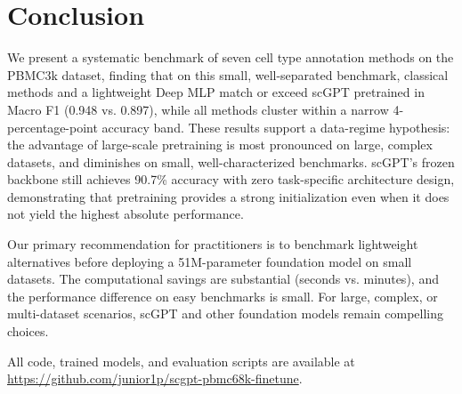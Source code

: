 \documentclass{article}
\begin{document}
\section{Conclusion}
\label{sec:conclusion}

We present a systematic benchmark of seven cell type annotation methods on the PBMC3k
dataset, finding that on this small, well-separated benchmark, classical methods and a
lightweight Deep MLP match or exceed scGPT pretrained in Macro F1 (0.948 vs. 0.897),
while all methods cluster within a narrow 4-percentage-point accuracy band. These results
support a data-regime hypothesis: the advantage of large-scale pretraining is most
pronounced on large, complex datasets, and diminishes on small, well-characterized
benchmarks. scGPT's frozen backbone still achieves 90.7\% accuracy with zero task-specific
architecture design, demonstrating that pretraining provides a strong initialization even
when it does not yield the highest absolute performance.

Our primary recommendation for practitioners is to benchmark lightweight alternatives
before deploying a 51M-parameter foundation model on small datasets. The computational
savings are substantial (seconds vs. minutes), and the performance difference on easy
benchmarks is small. For large, complex, or multi-dataset scenarios, scGPT and other
foundation models remain compelling choices.

All code, trained models, and evaluation scripts are available at
\url{https://github.com/junior1p/scgpt-pbmc68k-finetune}.



\end{document}
